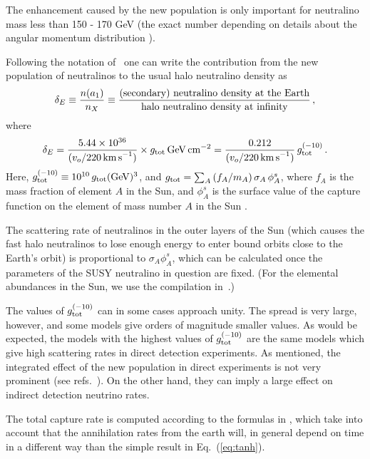 The enhancement caused by the new population is only important for
neutralino mass less than 150 - 170 GeV (the exact number depending on
details about the angular momentum distribution \cite{dkpop}).

Following the notation of~\cite{dk1,dk2} one can write the
contribution from the new population of neutralinos to the usual halo
neutralino density as
\begin{equation}
   \delta_E \equiv \frac{n (a_1)}{n_X} \equiv \frac{\hbox{(secondary) neutralino
   density at the Earth}}{\hbox{halo neutralino density at infinity}} \, ,
   \label{eq5.11}
\end{equation}
where
\begin{equation}
   \delta_E = \frac{5.44 \times 10^{36}}{(v_o / 220 \, {\rm km\,s}^{-1})}
   \times
   g_{\rm tot} \, {\rm GeV} \, {\rm cm}^{-2} = \frac{0.212}{(v_o / 220 \,
   {\rm km\,s}^{-1})} \, g_{\rm tot}^{(-10)} \, . \label{eq5.15}
\end{equation}
Here, $g_{\rm tot}^{(-10)} \equiv 10^{10} \, g_{\rm tot} ({\rm
GeV})^3$, and $g_{\rm tot} = { \sum_A} \, (f_A / m_A) \, \sigma_A \,
\phi_A^s$, where $f_A$ is the mass fraction of element $A$ in the Sun,
and $\phi_A^s$ is the surface value of the capture function on the
element of mass number $A$ in the Sun \cite{dk2}.

The scattering rate of neutralinos in the outer layers of the Sun (which
causes the fast halo neutralinos to lose enough energy to enter bound orbits
close to the Earth's orbit) is proportional to $\sigma_A \phi_A^s$, which
can be calculated once the parameters of the SUSY neutralino in question are
fixed. (For the elemental abundances in the Sun, we use the compilation
in~\cite{jnb}.)

The values of $g_{\rm tot}^{(-10)}$
can in some cases approach unity. The spread is
very large, however, and some models give orders of magnitude smaller
values. As would be expected, the models with the highest values of
$g_{\rm tot}^{(-10)}$ are the same models which give high scattering
rates in direct detection experiments.
As mentioned, the integrated effect of the
new population in direct experiments is not very prominent
(see refs.~\cite{dk1,dk2}). On
the other hand,  they can imply a large effect
on indirect detection neutrino rates.

The total capture rate  is computed according
to the formulas in \cite{dkpop}, which take into account that the annihilation
rates from the earth will, in general depend on time in a different
way than the simple result in Eq.~(\ref{eq:tanh}).

